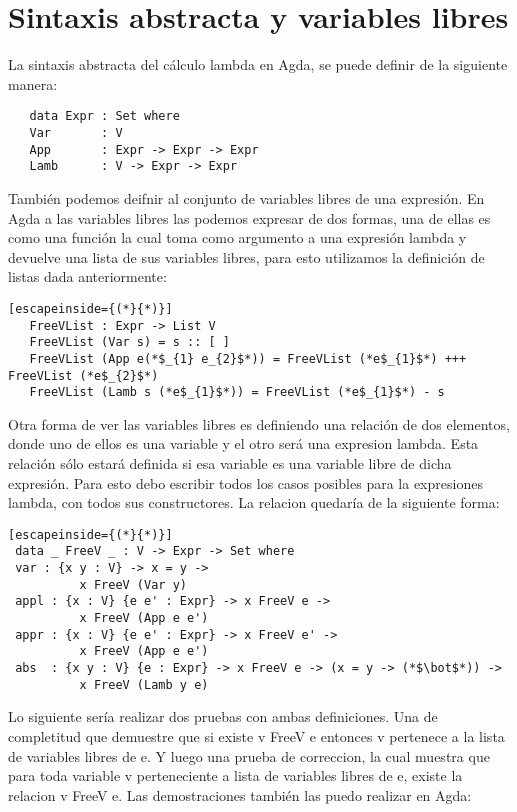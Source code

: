 \section{Sintaxis abstracta y variables libres}

La sintaxis abstracta del cálculo lambda  en Agda, se puede definir de la siguiente manera:

\begin{lstlisting}
   data Expr : Set where
   Var       : V
   App       : Expr -> Expr -> Expr
   Lamb      : V -> Expr -> Expr
\end{lstlisting}


También podemos deifnir al conjunto de variables libres de una expresión. En Agda a las variables libres las podemos expresar de dos formas, una de ellas es como una función la cual toma como argumento a una expresión lambda y devuelve una lista de sus variables libres, para esto utilizamos la definición de listas dada anteriormente:


\begin{lstlisting}[escapeinside={(*}{*)}]
   FreeVList : Expr -> List V
   FreeVList (Var s) = s :: [ ]
   FreeVList (App e(*$_{1} e_{2}$*)) = FreeVList (*e$_{1}$*) +++ FreeVList (*e$_{2}$*)
   FreeVList (Lamb s (*e$_{1}$*)) = FreeVList (*e$_{1}$*) - s
\end{lstlisting}

Otra forma de ver las variables libres es definiendo una relación de dos elementos, donde uno de ellos es una variable y el otro será una expresion lambda. Esta relación sólo estará definida si esa variable es una variable libre de dicha expresión.
Para esto debo escribir todos los casos posibles para la expresiones lambda, con todos sus constructores. La relacion quedaría de la siguiente forma:

\begin{lstlisting}[escapeinside={(*}{*)}]
 data _ FreeV _ : V -> Expr -> Set where
 var : {x y : V} -> x = y ->
          x FreeV (Var y)
 appl : {x : V} {e e' : Expr} -> x FreeV e ->
          x FreeV (App e e')
 appr : {x : V} {e e' : Expr} -> x FreeV e' ->
          x FreeV (App e e')
 abs  : {x y : V} {e : Expr} -> x FreeV e -> (x = y -> (*$\bot$*)) ->
          x FreeV (Lamb y e)
\end{lstlisting}
      

Lo siguiente sería realizar dos pruebas con ambas definiciones. Una de completitud que demuestre que si existe v FreeV e entonces v pertenece a la lista de variables libres de e. Y luego una prueba de correccion, la cual muestra que para toda variable v perteneciente a lista de variables libres de e, existe la relacion v FreeV e.
Las demostraciones también las puedo realizar en Agda:



